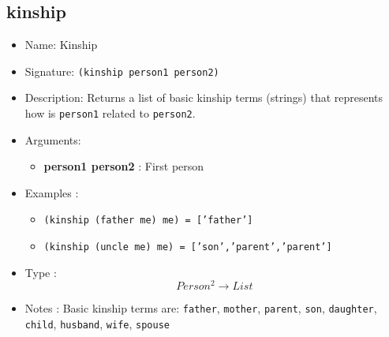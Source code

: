 \subsection{kinship}
\begin{itemize}
    \item Name: Kinship
    \item Signature: \texttt{(kinship person1 person2)}
    \item Description: Returns a list of basic kinship terms (strings) that represents how is \texttt{person1} related to \texttt{person2}.
    \item Arguments:
        \begin{itemize}
            \item \textbf{person1 person2} : First person
        \end{itemize}
    \item Examples :
        \begin{itemize}
            \item \texttt{(kinship (father me) me) = ['father']}
            \item \texttt{(kinship (uncle me) me) = ['son','parent','parent']}
        \end{itemize}
    \item Type : \[Person^2 \to List\]
    \item Notes : Basic kinship terms are: \texttt{father}, \texttt{mother}, \texttt{parent}, \texttt{son}, \texttt{daughter}, \texttt{child}, \texttt{husband}, \texttt{wife}, \texttt{spouse}
\end{itemize}

